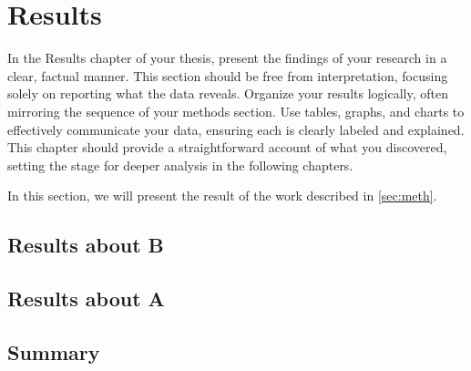 \section{Results}
\label{sec:res}

In the Results chapter of your thesis, present the findings of your research in a clear, factual manner. This section should be free from interpretation, focusing solely on reporting what the data reveals. Organize your results logically, often mirroring the sequence of your methods section. Use tables, graphs, and charts to effectively communicate your data, ensuring each is clearly labeled and explained. This chapter should provide a straightforward account of what you discovered, setting the stage for deeper analysis in the following chapters.

In this section, we will present the result of the work described in \cref{sec:meth}.

\subsection{Results about B}

\subsection{Results about A}

\subsection{Summary}
